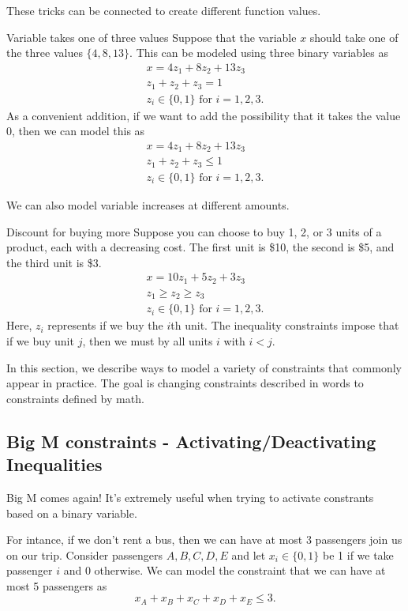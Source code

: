 These tricks can be connected to create different function values.  

\begin{example}{Variable takes one of three values}{}
Suppose that the variable $x$ should take one of the three values $\{4, 8, 13\}$. This can be modeled using three binary variables as
\begin{align*}
x=4z_1 +8z_2 +13z_3\\
 z_1 +z_2 +z_3 =1\\
z_i \in \{0, 1\} \text{ for } i = 1, 2,3.
\end{align*}
As a convenient addition, if we want to add the possibility that it takes the value $0$, then we can model this as 
\begin{align*}
x=4z_1 +8z_2 +13z_3\\
 z_1 +z_2 +z_3 \leq 1\\
z_i \in \{0, 1\} \text{ for } i = 1, 2,3.
\end{align*}
\end{example}


We can also model variable increases at different amounts.  \begin{example}{Discount for buying more}{}
Suppose you can choose to buy 1, 2, or 3 units of a product, each with a decreasing cost.  The first unit is \$10, the second is \$5, and the third unit is \$3.
\begin{align*}
x=10z_1 +5z_2 +3z_3\\
 z_1\geq z_2 \geq z_3\\
z_i \in \{0, 1\} \text{ for } i = 1, 2,3.
\end{align*}
Here, $z_i$ represents if we buy the $i$th unit.  The inequality constraints impose that if we buy unit $j$, then we must by all units $i$ with $i < j$.
\end{example}



In this section, we describe ways to model a variety of constraints that commonly appear in practice.  The goal is changing constraints described in words to constraints defined by math.
\subsection{Big M constraints - Activating/Deactivating Inequalities}
Big M comes again!   It's extremely useful when trying to activate constrants based on a binary variable.

For intance, if we don't rent a bus, then we can have at most 3 passengers join us on our trip.   Consider passengers $A,B,C,D,E$ and let $x_i \in \{0,1\}$ be 1 if we take passenger $i$ and 0 otherwise.
We can model the constraint that we can have at most 5 passengers as 
$$
x_A + x_B + x_C + x_D + x_E \leq 3.
$$

